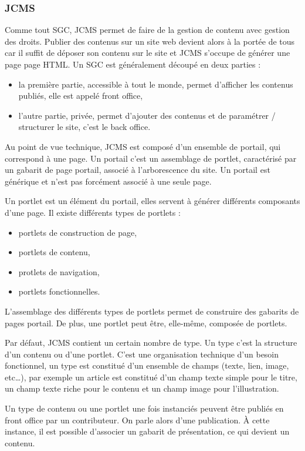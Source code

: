 \documentclass[12pt,a4paper]{article}
\begin{document}
\subsubsection{JCMS}
Comme tout SGC, \gls{JCMS} permet de faire de la gestion de contenu avec gestion des droits. Publier des contenus sur un site web devient alors à la portée de tous car il suffit de déposer son contenu sur le site et \gls{JCMS} s'occupe de générer une page page \gls{HTML}. Un SGC est généralement découpé en deux parties : 
\begin{itemize}
\item la première partie, accessible à tout le monde, permet d'afficher les contenus publiés, elle est appelé front office,
\item l'autre partie, privée, permet d'ajouter des contenus et de paramétrer / structurer le site, c'est le back office.
\end{itemize}\par
Au point de vue technique, \gls{JCMS} est composé d'un ensemble de portail, qui correspond à une page. Un portail c'est un assemblage de portlet, caractérisé par un gabarit de page portail, associé à l'arborescence du site. Un portail est générique et n'est pas forcément associé à une seule page.\par 
Un portlet est un élément du portail, elles servent à générer différents composants d'une page. Il existe différents types de portlets : 
\begin{itemize}
\item portlets de construction de page,
\item portlets de contenu,
\item protlets de navigation,
\item portlets fonctionnelles.
\end{itemize}
L'assemblage des différents types de portlets permet de construire des gabarits de pages portail. De plus, une portlet peut être, elle-même, composée de portlets.\par 
Par défaut, \gls{JCMS} contient un certain nombre de type. Un type c'est la structure d'un contenu ou d'une portlet. C'est une organisation technique d'un besoin fonctionnel, un type est constitué d'un ensemble de champs (texte, lien, image, etc…), par exemple un article est constitué d'un champ texte simple pour le titre, un champ texte riche pour le contenu et un champ image pour l'illustration.\par 
Un type de contenu ou une portlet une fois instanciés peuvent être publiés en front office par un contributeur. On parle alors d'une publication. À cette instance, il est possible d'associer un gabarit de présentation, ce qui devient un contenu.\par
\end{document}
